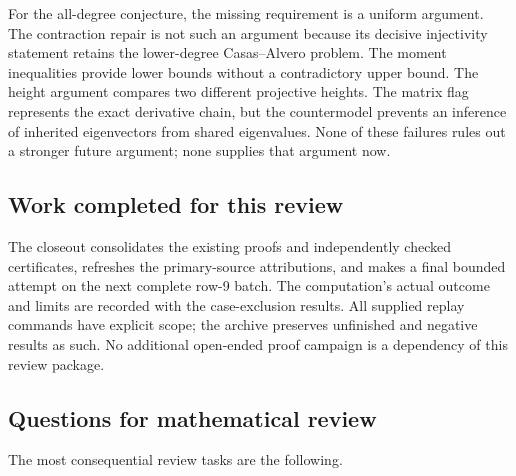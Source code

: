\documentclass[
  british,
  10pt,
]{article}
\newcounter{none} %
\begin{document}
For the all-degree conjecture, the missing requirement is a uniform
argument. The contraction repair is not such an argument because its
decisive injectivity statement retains the lower-degree Casas--Alvero
problem. The moment inequalities provide lower bounds without a
contradictory upper bound. The height argument compares two different
projective heights. The matrix flag represents the exact derivative
chain, but the countermodel prevents an inference of inherited
eigenvectors from shared eigenvalues. None of these failures rules out a
stronger future argument; none supplies that argument now.

\subsection{Work completed for this
review}\label{work-completed-for-this-review}

The closeout consolidates the existing proofs and independently checked
certificates, refreshes the primary-source attributions, and makes a
final bounded attempt on the next complete row-9 batch. The
computation's actual outcome and limits are recorded with the
case-exclusion results. All supplied replay commands have explicit
scope; the archive preserves unfinished and negative results as such. No
additional open-ended proof campaign is a dependency of this review
package.

\subsection{Questions for mathematical
review}\label{questions-for-mathematical-review}

The most consequential review tasks are the following.
\end{document}
